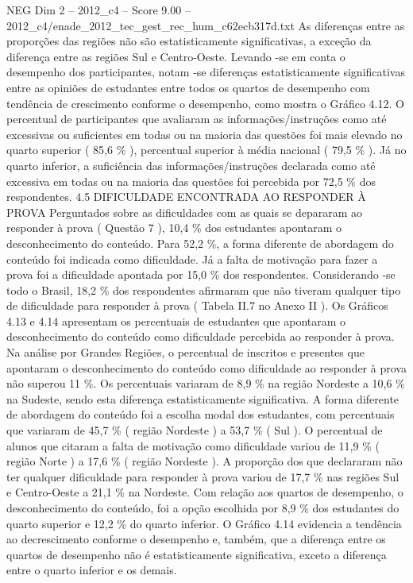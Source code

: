 \begin{textsample}{NEG Dim 2 – 2012\_c4 – Score 9.00 – 2012\_c4/enade\_2012\_tec\_gest\_rec\_hum\_c62ecb317d.txt}
As diferenças entre as proporções das regiões não são estatisticamente significativas, a exceção da diferença entre as regiões Sul e Centro-Oeste.
Levando -se em conta o desempenho dos participantes, notam -se diferenças estatisticamente significativas entre as opiniões de estudantes entre todos os quartos de desempenho com tendência de crescimento conforme o desempenho, como mostra o Gráfico 4.12.
O percentual de participantes que avaliaram as informações/instruções como até excessivas ou suficientes em todas ou na maioria das questões foi mais elevado no quarto superior ( 85,6 \% ), percentual superior à média nacional ( 79,5 \% ).
Já no quarto inferior, a suficiência das informações/instruções declarada como até excessiva em todas ou na maioria das questões foi percebida por 72,5 \% dos respondentes. 4.5 DIFICULDADE ENCONTRADA AO RESPONDER À PROVA Perguntados sobre as dificuldades com as quais se depararam ao responder à prova ( Questão 7 ), 10,4 \% dos estudantes apontaram o desconhecimento do conteúdo.
Para 52,2 \%, a forma diferente de abordagem do conteúdo foi indicada como dificuldade.
Já a falta de motivação para fazer a prova foi a dificuldade apontada por 15,0 \% dos respondentes.
Considerando -se todo o Brasil, 18,2 \% dos respondentes afirmaram que não tiveram qualquer tipo de dificuldade para responder à prova ( Tabela II.7 no Anexo II ).
Os Gráficos 4.13 e 4.14 apresentam os percentuais de estudantes que apontaram o desconhecimento do conteúdo como dificuldade percebida ao responder à prova.
Na análise por Grandes Regiões, o percentual de inscritos e presentes que apontaram o desconhecimento do conteúdo como dificuldade ao responder à prova não superou 11 \%.
Os percentuais variaram de 8,9 \% na região Nordeste a 10,6 \% na Sudeste, sendo esta diferença estatisticamente significativa.
A forma diferente de abordagem do conteúdo foi a escolha modal dos estudantes, com percentuais que variaram de 45,7 \% ( região Nordeste ) a 53,7 \% ( Sul ).
O percentual de alunos que citaram a falta de motivação como dificuldade variou de 11,9 \% ( região Norte ) a 17,6 \% ( região Nordeste ).
A proporção dos que declararam não ter qualquer dificuldade para responder à prova variou de 17,7 \% nas regiões Sul e Centro-Oeste a 21,1 \% na Nordeste.
Com relação aos quartos de desempenho, o desconhecimento do conteúdo, foi a opção escolhida por 8,9 \% dos estudantes do quarto superior e 12,2 \% do quarto inferior.
O Gráfico 4.14 evidencia a tendência ao decrescimento conforme o desempenho e, também, que a diferença entre os quartos de desempenho não é estatisticamente significativa, exceto a diferença entre o quarto inferior e os demais.

\end{textsample}

